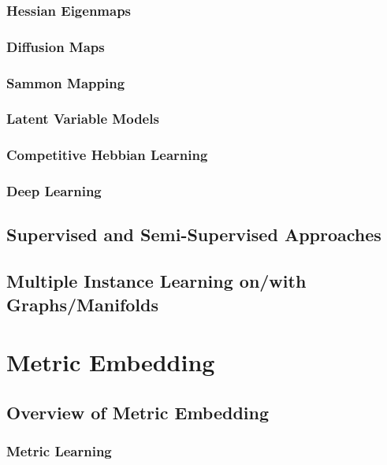 \subsubsection{Hessian Eigenmaps}

\subsubsection{Diffusion Maps}

\subsubsection{Sammon Mapping}

\subsubsection{Latent Variable Models}

\subsubsection{Competitive Hebbian Learning}

\subsubsection{Deep Learning}


\subsection{Supervised and Semi-Supervised Approaches}

\subsection{Multiple Instance Learning on/with Graphs/Manifolds}

\section{Metric Embedding}

	\subsection{Overview of Metric Embedding}
	
		\subsubsection{Metric Learning}

